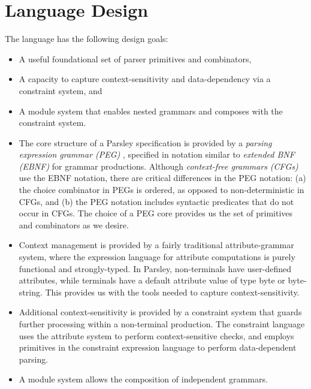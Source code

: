 \documentclass[letterpaper]{article}
\begin{document}
\section{Language Design}

The language has the following design goals:

\begin{itemize}
\item A useful foundational set of parser primitives and combinators,
\item A capacity to capture context-sensitivity and data-dependency
  via a constraint system, and
\item  A module system that enables nested grammars and composes with
  the constraint system.
\end{itemize}

\begin{itemize}
\item The core structure of a Parsley specification is provided by a
  {\em parsing expression grammar (PEG)} \cite{ford2004popl},
  specified in notation similar to  {\em extended BNF (EBNF)} for
  grammar productions.  Although {\em context-free grammars (CFGs)}
  use the EBNF notation, there are critical differences in the PEG
  notation: (a) the choice combinator in PEGs is ordered, as opposed
  to non-deterministic in CFGs, and (b) the PEG notation includes
  syntactic predicates that do not occur in CFGs.  The choice of a PEG
  core provides us the set of primitives and combinators as we desire.

\item Context management is provided by a fairly traditional
  attribute-grammar system, where the expression language for
  attribute computations is purely functional and strongly-typed.  In
  Parsley, non-terminals have user-defined attributes, while terminals
  have a default attribute value of type byte or byte-string.  This
  provides us with the tools needed to capture context-sensitivity.

\item Additional context-sensitivity is provided by a constraint
  system that guards further processing  within a non-terminal production.
  The constraint language uses the attribute system to perform
  context-sensitive checks, and employs primitives in the constraint
  expression language to perform data-dependent parsing.

\item A module system allows the composition of independent grammars.
\end{itemize}
\end{document}
